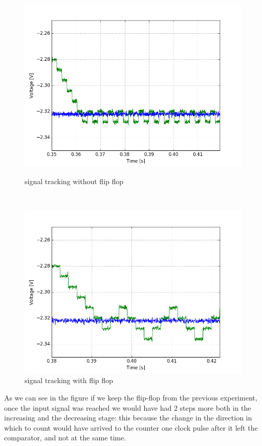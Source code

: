 \begin{figure}[H]
\centering
\begin{minipage}{.48\textwidth}
\centering
\includegraphics[width=\textwidth]{12/good.png}
\caption{signal tracking without flip flop}
\end{minipage}\,
\begin{minipage}{.48\textwidth}
\centering
\includegraphics[width=\textwidth]{12/good2.png}
\caption{signal tracking with flip flop}
\end{minipage}
\end{figure}

As we can see in the figure if we keep the flip-flop from the previous experiment, once the input signal was reached we would have had 2 steps more both in the increasing and the decreasing stage: this because the change in the direction in which to count would have arrived to the counter one clock pulse after it left the comparator, and not at the same time.
